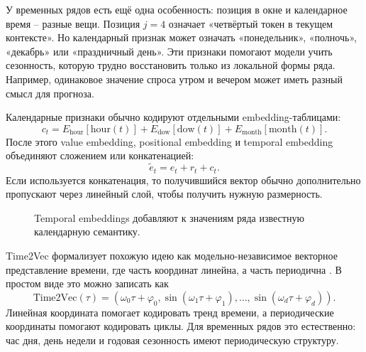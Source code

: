 \documentclass[12pt,fleqn]{article}
\begin{document}
У временных рядов есть ещё одна особенность: позиция в окне и календарное время -- разные вещи.
Позиция $j=4$ означает «четвёртый токен в текущем контексте».
Но календарный признак может означать «понедельник», «полночь», «декабрь» или «праздничный день».
Эти признаки помогают модели учить сезонность, которую трудно восстановить только из локальной формы ряда.
Например, одинаковое значение спроса утром и вечером может иметь разный смысл для прогноза.

Календарные признаки обычно кодируют отдельными embedding-таблицами:
\begin{equation}
  c_t =
  E_{\mathrm{hour}}[\mathrm{hour}(t)]
  +
  E_{\mathrm{dow}}[\mathrm{dow}(t)]
  +
  E_{\mathrm{month}}[\mathrm{month}(t)].
\end{equation}
После этого value embedding, positional embedding и temporal embedding объединяют сложением или конкатенацией:
\begin{equation}
  \widetilde{e}_t = e_t + r_t + c_t.
\end{equation}
Если используется конкатенация, то получившийся вектор обычно дополнительно пропускают через линейный слой, чтобы получить нужную размерность.

\begin{figure}[!ht]
\centering
{}
\caption{Temporal embeddings добавляют к значениям ряда известную календарную семантику.}
\end{figure}

Time2Vec формализует похожую идею как модельно-независимое векторное представление времени, где часть координат линейна, а часть периодична \cite{kazemi2019time2vec}.
В простом виде это можно записать как
\begin{equation}
  \mathrm{Time2Vec}(\tau)
  =
  \left(
    \omega_0 \tau + \varphi_0,
    \sin(\omega_1 \tau + \varphi_1),
    \ldots,
    \sin(\omega_d \tau + \varphi_d)
  \right).
\end{equation}
Линейная координата помогает кодировать тренд времени, а периодические координаты помогают кодировать циклы.
Для временных рядов это естественно: час дня, день недели и годовая сезонность имеют периодическую структуру.
\end{document}
